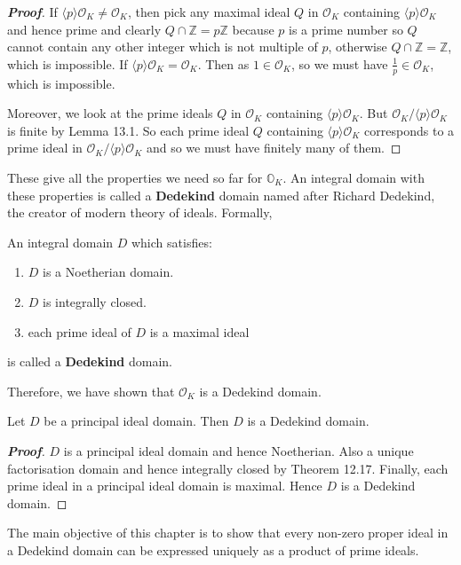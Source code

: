 \begin{proof}[\bf Proof] If $\langle p \rangle \mathcal{O}_K \neq \mathcal{O}_K$, then pick any maximal ideal $Q$ in $\mathcal{O}_K$ containing $\langle p \rangle \mathcal{O}_K$ and hence prime and clearly $Q \cap \mathbb{Z}=p\mathbb{Z}$ because $p$ is a prime number so $Q$ cannot contain any other integer which is not multiple of $p$, otherwise $Q \cap \mathbb{Z}=\mathbb{Z}$, which is impossible. If $\langle p \rangle \mathcal{O}_K=\mathcal{O}_K$. Then as $1 \in \mathcal{O}_K$, so we must have $\frac{1}{p} \in \mathcal{O}_K$, which is impossible.

Moreover, we look at the prime ideals $Q$ in $\mathcal{O}_K$ containing $\langle p \rangle \mathcal{O}_K$.
But $\mathcal{O}_K/\langle p \rangle \mathcal{O}_K$ is finite by Lemma 13.1. So each prime ideal $Q$ containing
$\langle p \rangle \mathcal{O}_K$ corresponds to a prime ideal in $\mathcal{O}_K/\langle p \rangle \mathcal{O}_K$ and so we must have finitely many of them.
\end{proof}
These give all the properties we need so far for $\mathbb{O}_K$. An integral domain with these properties is called a {\bf Dedekind} domain named after Richard Dedekind, the creator of modern theory of ideals. Formally,
\begin{definition} An integral domain $D$ which satisfies:
\begin{enumerate}
\item $D$ is a Noetherian domain.
\item $D$ is integrally closed.
\item each prime ideal of $D$ is a maximal ideal
\end{enumerate}
is called a {\bf Dedekind} domain.
\end{definition}
Therefore, we have shown that $\mathcal{O}_K$ is a Dedekind domain.
\begin{theorem} Let $D$ be a principal ideal domain. Then $D$ is a Dedekind domain.
\end{theorem}
\begin{proof}[\bf Proof] $D$ is a principal ideal domain and hence Noetherian. Also a unique factorisation domain and hence integrally closed by Theorem 12.17. Finally, each prime ideal in a principal ideal domain is maximal. Hence $D$ is a Dedekind domain.
\end{proof}
The main objective of this chapter is to show that every non-zero proper ideal in a Dedekind domain can be expressed uniquely as a product of prime ideals.
